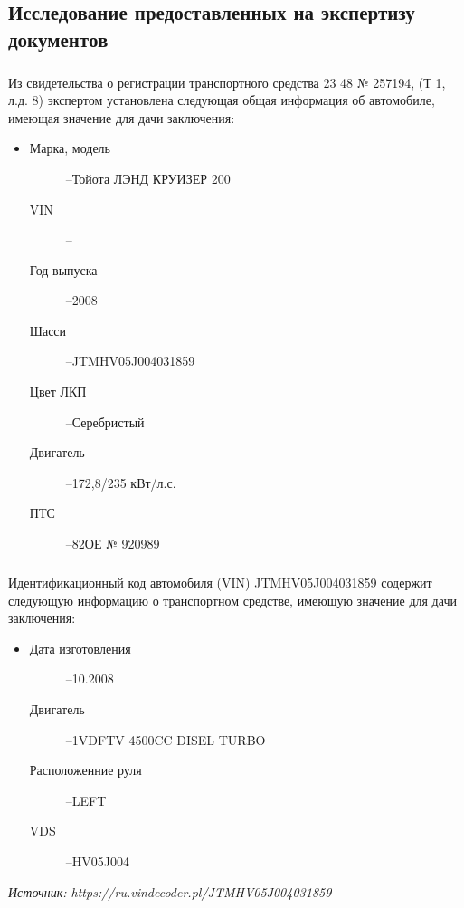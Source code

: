 \subsection{Исследование предоставленных на экспертизу документов}
%
 \subparagraph*{}Из свидетельства о регистрации транспортного средства 23 48 № 257194,  (Т 1, л.д. 8)  экспертом установлена следующая общая информация об автомобиле, имеющая значение для дачи заключения:
	\begin{itemize}
		\item[ ] 
			\begin{description}
			\item[Марка, модель] --Тойота ЛЭНД КРУИЗЕР 200
			\item[VIN] -- \vin
			\item[Год выпуска] --2008
			\item[Шасси] --JTMHV05J004031859
			\item[Цвет ЛКП] --Серебристый
			\item[Двигатель] --172,8/235 кВт/л.с.
			\item[ПТС] --82ОЕ № 920989
%						
		\end{description}
		\end{itemize}
	\subparagraph*{} Идентификационный код автомобиля (VIN)  JTMHV05J004031859 содержит следующую информацию о транспортном средстве, имеющую значение для 	дачи заключения:
%
\begin{itemize}
	\item[ ] 
	    \begin{description}
%		
	\item[Дата изготовления] --10.2008
	\item[Двигатель] --1VDFTV  4500CC DISEL TURBO
	\item [Расположенние руля] --LEFT
	\item[VDS] --HV05J004
%	
		\end{description}
\end{itemize}
%
%
\textit{Источник: https://ru.vindecoder.pl/JTMHV05J004031859}

